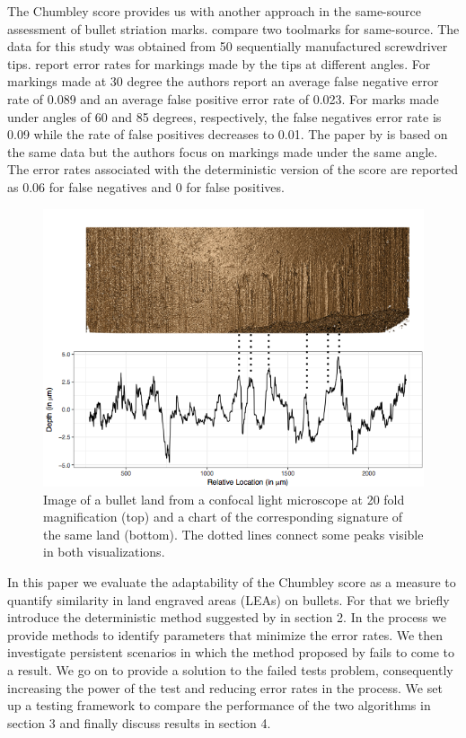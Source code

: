 \documentclass[12pt]{article}
\begin{document}
The Chumbley score provides us with another approach in the same-source
assessment of bullet striation marks. \citet{chumbley} compare two
toolmarks for same-source. The data for this study was obtained from 50
sequentially manufactured screwdriver tips. \citet{chumbley} report
error rates for markings made by the tips at different angles. For
markings made at 30 degree the authors report an average false negative
error rate of 0.089 and an average false positive error rate of 0.023.
For marks made under angles of 60 and 85 degrees, respectively, the
false negatives error rate is 0.09 while the rate of false positives
decreases to 0.01. The paper by \citet{hadler} is based on the same data
but the authors focus on markings made under the same angle. The error
rates associated with the deterministic version of the score are
reported as 0.06 for false negatives and 0 for false positives.

\begin{figure}
\centering
\includegraphics[width=\textwidth]{images/B6-B2-L6-rescaled.png}


\caption{\label{fig:rgl} Image of a bullet land from a confocal light microscope at 20 fold magnification (top) and a chart of the corresponding signature of the same land (bottom). The dotted lines connect some peaks visible in both visualizations.}

\end{figure}

In this paper we evaluate the adaptability of the Chumbley score as a
measure to quantify similarity in land engraved areas (LEAs) on bullets.
For that we briefly introduce the deterministic method suggested by
\citet{hadler} in section 2. In the process we provide methods to
identify parameters that minimize the error rates. We then investigate
persistent scenarios in which the method proposed by \citet{hadler}
fails to come to a result. We go on to provide a solution to the failed
tests problem, consequently increasing the power of the test and
reducing error rates in the process. We set up a testing framework to
compare the performance of the two algorithms in section 3 and finally
discuss results in section 4.
\end{document}
